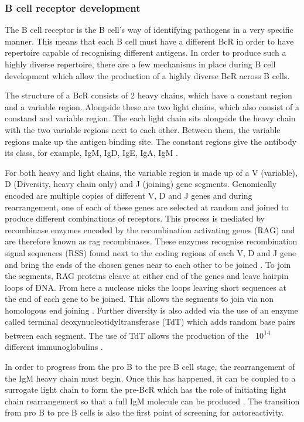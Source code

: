 \subsubsection{B cell receptor development}
\label{subsubsec:Bcellrecepdevelopment}

The B cell receptor is the B cell's way of identifying pathogens in a very specific manner.
This means that each B cell must have a different BcR in order to have repertoire capable of recognising different antigens.
In order to produce such a highly diverse repertoire, there are a few mechanisms in place during B cell development which allow the production of a highly diverse BcR across B cells.

The structure of a BcR consists of 2 heavy chains, which have a constant region and a variable region.
Alongside these are two light chains, which also consist of a constand and variable region.
The each light chain sits alongside the heavy chain with the two variable regions next to each other.
Between them, the variable regions make up the antigen binding site.
The constant regions give the antibody its class, for example, IgM, IgD, IgE, IgA, IgM \citep{Pieper2013}.

For both heavy and light chains, the variable region is made up of a V (variable), D (Diversity, heavy chain only) and J (joining) gene segments. 
Genomically encoded are multiple copies of different V, D and J genes and during rearrangement, one of each of these genes are selected at random and joined to produce different combinations of receptors.
This process is mediated by recombinase enzymes encoded by the recombination activating genes (RAG) and are therefore known as rag recombinases.
These enzymes recognise recombination signal sequences (RSS) found next to the coding regions of each V, D and J gene and bring the ends of the chosen genes near to each other to be joined \citep{Fugmann2014, Oettinger1999}.
To join the segments, RAG proteins cleave at either end of the genes and leave hairpin loops of DNA.
From here a nuclease nicks the loops leaving short sequences at the end of each gene to be joined.
This allows the segments to join via non homologous end joining \citep{Schatz2011}.
Further diversity is also added via the use of an enzyme called terminal deoxynucleotidyltransferase (TdT) which adds random base pairs between each segment.
The use of TdT allows the production of the ~10\textsuperscript{14} different immunoglobulins \citep{Motea2010}.

In order to progress from the pro B to the pre B cell stage, the rearrangement of the IgM heavy chain must begin.
Once this has happened, it can be coupled to a surrogate light chain to form the pre-BcR which has the role of initiating light chain rearrangement so that a full IgM molecule can be produced \citep{Burrows2002}.
The transition from pro B to pre B cells is also the first point of screening for autoreactivity\citep{Pieper2013}.

